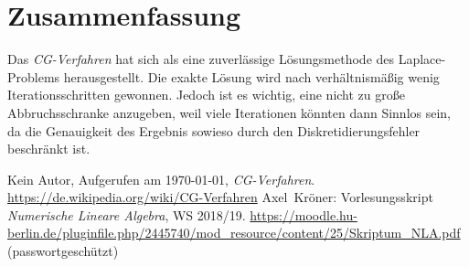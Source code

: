 \documentclass[smallheadings]{scrartcl}
\numberwithin{equation}{section}
\begin{document}
\section{Zusammenfassung}

Das \textit{CG-Verfahren} hat sich als eine zuverlässige Lösungsmethode des Laplace-Problems herausgestellt. Die exakte Lösung wird nach verhältnismäßig wenig Iterationsschritten gewonnen. Jedoch ist es wichtig, eine nicht zu große Abbruchsschranke anzugeben, weil viele Iterationen könnten dann Sinnlos sein, da die Genauigkeit des Ergebnis sowieso durch den Diskretidierungsfehler beschränkt ist.

\begin{thebibliography}{9}
 Kein Autor, Aufgerufen am \today, \textit{CG-Verfahren}. 
\url{https://de.wikipedia.org/wiki/CG-Verfahren}
 Axel~Kröner: Vorlesungsskript \textit{Numerische Lineare Algebra}, WS 2018/19. 
\url{https://moodle.hu-berlin.de/pluginfile.php/2445740/mod_resource/content/25/Skriptum_NLA.pdf} (passwortgeschützt)
\end{thebibliography}


\end{document}
